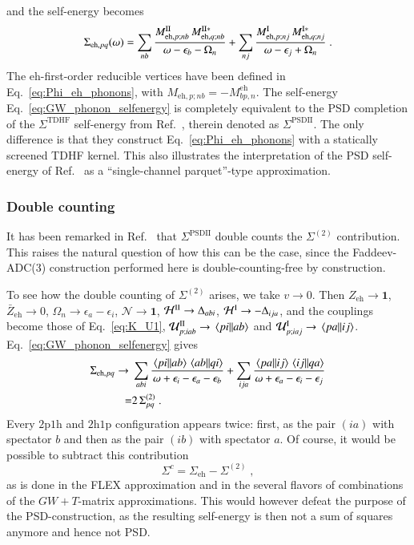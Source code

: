 \documentclass[aip,jcp,reprint,noshowkeys,superscriptaddress]{revtex4-1}
\newcommand{\bI}{\boldsymbol{1}}
\newcommand{\eps}{\epsilon}
\newcommand{\hhp}{\text{2h1p}}
\newcommand{\pph}{\text{2p1h}}
\newcommand{\eh}{\text{eh}}
\begin{document}
and the self-energy becomes
\begin{equation}
	\label{eq:GW_phonon_selfenergy}
\Sigma_{\eh,pq}(\omega)
=
\sum_{nb}
\frac{M^{\rm II}_{\eh,p;nb}\,M^{{\rm II}*}_{\eh,q;nb}}{\omega-\eps_b-\Omega_n}
+\sum_{nj}
\frac{M^{\rm I}_{\eh,p;nj}\,M^{{\rm I}*}_{\eh,q;nj}}{\omega-\eps_j+\Omega_n} \;.
\end{equation}
The $\eh$-first-order reducible vertices have been
defined in Eq.~\eqref{eq:Phi_eh_phonons}, with $M_{\eh,p;nb}=-M^{\eh}_{bp,n}$.
The self-energy Eq.~\eqref{eq:GW_phonon_selfenergy}
is completely equivalent to the PSD completion of
the $\Sigma^{\text{TDHF}}$ self-energy\cite{Forster2024} from
Ref.~, therein denoted as $\Sigma^\text{PSDII}$. The 
only difference is that they construct
Eq.~\eqref{eq:Phi_eh_phonons} with a statically
screened TDHF kernel. This also illustrates the
interpretation of the PSD self-energy of
Ref.~ as a ``single-channel parquet''-type
approximation.

\subsubsection{Double counting}
It has been remarked in Ref.~ that $\Sigma^\text{PSDII}$ 
double counts the $\Sigma^{(2)}$ contribution.
This raises the natural question of how this can be the case, 
since the Faddeev-ADC(3) construction performed here is double-counting-free 
by construction. 

To see how the double counting of $\Sigma^{(2)}$ arises, we take
$v\to0$. Then $Z_{\eh}\to\bI$, $\bar Z_{\eh}\to0$, $\Omega_n\to\eps_a-\eps_i$,
$\mathcal N\to\bI$, $\mathcal H^{\rm II}\to\Delta_{abi}$,
$\mathcal H^{\rm I}\to-\Delta_{ija}$, and the couplings become those of
Eq.~\eqref{eq:K_U1}, $\mathcal U^{\rm II}_{p;iab}\to\mel{pi}{}{ab}$ and
$\mathcal U^{\rm I}_{p;iaj}\to\mel{pa}{}{ij}$.
Eq.~\eqref{eq:GW_phonon_selfenergy} gives
\begin{equation}
	\label{eq:Sigma31_GF2}
\begin{aligned}
\Sigma_{\eh,pq}
\to{}&
\sum_{abi}
\frac{\mel{pi}{}{ab}\mel{ab}{}{qi}}{\omega+\eps_i-\eps_a-\eps_b}
+\sum_{ija}
\frac{\mel{pa}{}{ij}\mel{ij}{}{qa}}{\omega+\eps_a-\eps_i-\eps_j}
\\ = &
2\,\Sigma^{(2)}_{pq} \;.
\end{aligned}
\end{equation}
Every $\pph$ and $\hhp$ configuration
appears twice: first, as the pair $(ia)$ with spectator $b$
and then as the pair $(ib)$ with spectator $a$.
Of course, it would be possible to subtract this contribution
\begin{equation}
\Sigma^{c}
=
\Sigma_{\eh}-\Sigma^{(2)} \;,
\label{eq:eh_dc}
\end{equation}
as is done in the FLEX approximation\cite{Bickers1989,Bickers1989b,Bickers2004,MarieLoos2025}
and in the several flavors of combinations of the 
$GW + T$-matrix approximations.\cite{Springer1998,Zhukov2004}
This would however defeat the 
purpose of the PSD-construction, as the resulting self-energy 
is then not a sum of squares anymore and hence not PSD. 
\end{document}
